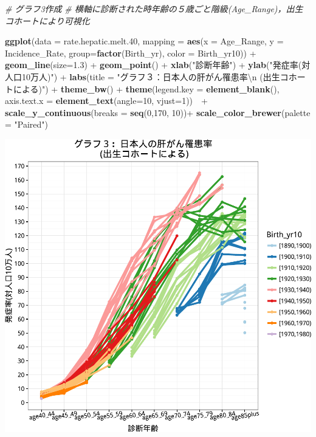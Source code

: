 \documentclass[11pt,]{article}
\newenvironment{Shaded}{\begin{snugshade}}{\end{snugshade}}
\newcommand{\KeywordTok}[1]{\textcolor[rgb]{0.13,0.29,0.53}{\textbf{{#1}}}}
\newcommand{\DataTypeTok}[1]{\textcolor[rgb]{0.13,0.29,0.53}{{#1}}}
\newcommand{\DecValTok}[1]{\textcolor[rgb]{0.00,0.00,0.81}{{#1}}}
\newcommand{\FloatTok}[1]{\textcolor[rgb]{0.00,0.00,0.81}{{#1}}}
\newcommand{\CharTok}[1]{\textcolor[rgb]{0.31,0.60,0.02}{{#1}}}
\newcommand{\StringTok}[1]{\textcolor[rgb]{0.31,0.60,0.02}{{#1}}}
\newcommand{\CommentTok}[1]{\textcolor[rgb]{0.56,0.35,0.01}{\textit{{#1}}}}
\newcommand{\NormalTok}[1]{{#1}}
\begin{document}
\begin{Shaded}
\begin{Highlighting}[]
\CommentTok{#  グラフ3作成}
\CommentTok{#  横軸に診断された時年齢の５歳ごと階級(Age_Range)，出生コホートにより可視化}


\KeywordTok{ggplot}\NormalTok{(}\DataTypeTok{data =} \NormalTok{rate.hepatic.melt}\FloatTok{.40}\NormalTok{,}
       \DataTypeTok{mapping =} \KeywordTok{aes}\NormalTok{(}\DataTypeTok{x =} \NormalTok{Age_Range, }\DataTypeTok{y =} \NormalTok{Incidence_Rate, }\DataTypeTok{group=}\KeywordTok{factor}\NormalTok{(Birth_yr),}
                     \DataTypeTok{color =} \NormalTok{Birth_yr10)) +}\StringTok{ }
\StringTok{  }\KeywordTok{geom_line}\NormalTok{(}\DataTypeTok{size=}\FloatTok{1.3}\NormalTok{) +}
\StringTok{  }\KeywordTok{geom_point}\NormalTok{() +}
\StringTok{    }\KeywordTok{xlab}\NormalTok{(}\StringTok{"診断年齢"}\NormalTok{) +}\StringTok{ }
\StringTok{    }\KeywordTok{ylab}\NormalTok{(}\StringTok{"発症率(対人口10万人)"}\NormalTok{) +}\StringTok{ }
\StringTok{    }\KeywordTok{labs}\NormalTok{(}\DataTypeTok{title =} 
           \StringTok{"グラフ３：日本人の肝がん罹患率}\CharTok{\textbackslash{}n}\StringTok{ (出生コホートによる)"}\NormalTok{) +}\StringTok{ }
\StringTok{    }\KeywordTok{theme_bw}\NormalTok{() +}
\StringTok{    }\KeywordTok{theme}\NormalTok{(}\DataTypeTok{legend.key =} \KeywordTok{element_blank}\NormalTok{(),}
          \DataTypeTok{axis.text.x =} \KeywordTok{element_text}\NormalTok{(}\DataTypeTok{angle=}\DecValTok{10}\NormalTok{, }\DataTypeTok{vjust=}\DecValTok{1}\NormalTok{))　+}\StringTok{ }
\StringTok{  }\KeywordTok{scale_y_continuous}\NormalTok{(}\DataTypeTok{breaks =} \KeywordTok{seq}\NormalTok{(}\DecValTok{0}\NormalTok{,}\DecValTok{170}\NormalTok{, }\DecValTok{10}\NormalTok{))+}
\StringTok{  }\KeywordTok{scale_color_brewer}\NormalTok{(}\DataTypeTok{palette =} \StringTok{"Paired"}\NormalTok{)}
\end{Highlighting}
\end{Shaded}

\includegraphics{example_files/figure-latex/unnamed-chunk-6-1.pdf}
\end{document}
